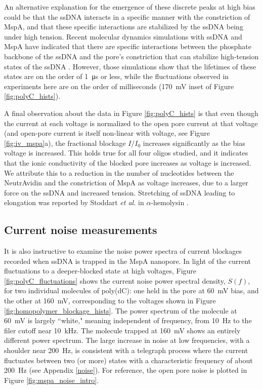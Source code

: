 An alternative explanation for the emergence of these discrete peaks at high bias could be that the ssDNA interacts in a specific manner with the constriction of MspA, and that these specific interactions are stabilized by the ssDNA being under high tension.  Recent molecular dynamics simulations with ssDNA and MspA have indicated that there are specific interactions between the phosphate backbone of the ssDNA and the pore's constriction that can stabilize high-tension states of the ssDNA \citep{Bhattacharya2016a}.  However, those simulations show that the lifetimes of these states are on the order of \SI{1}{\micro\s} or less, while the fluctuations observed in experiments here are on the order of milliseconds (\SI{170}{\mV} inset of Figure \ref{fig:polyC_hists}).

A final observation about the data in Figure \ref{fig:polyC_hists} is that even though the current at each voltage is normalized to the open pore current at that voltage (and open-pore current is itself non-linear with voltage, see Figure \ref{fig:iv_mspa}a), the fractional blockage $I/I_0$ increases significantly as the bias voltage is increased.  This holds true for all four oligos studied, and it indicates that the ionic conductivity of the blocked pore increases as voltage is increased.  We attribute this to a reduction in the number of nucleotides between the NeutrAvidin and the constriction of MspA as voltage increases, due to a larger force on the ssDNA and increased tension.  Stretching of ssDNA leading to elongation was reported by Stoddart \textit{et al.} in $\alpha$-hemolysin \citep{Stoddart2015}.

\subsection{Current noise measurements}

It is also instructive to examine the noise power spectra of current blockages recorded when ssDNA is trapped in the MspA nanopore.  In light of the current fluctuations to a deeper-blocked state at high voltages, Figure \ref{fig:polyC_fluctuations} shows the current noise power spectral density, $S(f)$, for two individual molecules of poly(dC): one held in the pore at \SI{60}{\mV} bias, and the other at \SI{160}{\mV}, corresponding to the voltages shown in Figure \ref{fig:homopolymer_blockage_hists}.  The power spectrum of the molecule at \SI{60}{\mV} is largely ``white," meaning independent of frequency, from \SI{10}{\Hz} to the filer cutoff near \SI{10}{\kHz}.  The molecule trapped at \SI{160}{\mV} shows an entirely different power spectrum.  The large increase in noise at low frequencies, with a shoulder near \SI{200}{\Hz}, is consistent with a telegraph process where the current fluctuates between two (or more) states \citep{Dutta1981} with a characteristic frequency of about \SI{200}{\Hz} (see Appendix \ref{noise}).  For reference, the open pore noise is plotted in Figure \ref{fig:mspa_noise_intro}.

